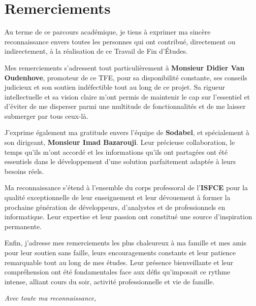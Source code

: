 \chapter*{Remerciements}

\noindent Au terme de ce parcours académique, je tiens à exprimer ma sincère reconnaissance envers toutes les personnes qui ont contribué, directement ou indirectement, à la réalisation de ce Travail de Fin d'Études.

\vspace{0.5cm}
\noindent Mes remerciements s'adressent tout particulièrement à \textbf{Monsieur Didier Van Oudenhove}, promoteur de ce TFE, pour sa disponibilité constante, ses conseils judicieux et son soutien indéfectible tout au long de ce projet. Sa rigueur intellectuelle et sa vision claire m'ont permis de maintenir le cap sur l'essentiel et d'éviter de me disperser parmi une multitude de fonctionnalités et de me laisser submerger par tous ceux-là.

\vspace{0.5cm}
\noindent J'exprime également ma gratitude envers l'équipe de \textbf{Sodabel}, et spécialement à son dirigeant, \textbf{Monsieur Imad Bazarouji}. Leur précieuse collaboration, le temps qu'ils m'ont accordé et les informations qu'ils ont partagées ont été essentiels dans le développement d'une solution parfaitement adaptée à leurs besoins réels.

\vspace{0.5cm}
\noindent Ma reconnaissance s'étend à l'ensemble du corps professoral de l'\textbf{ISFCE} pour la qualité exceptionnelle de leur enseignement et leur dévouement à former la prochaine génération de développeurs, d'analystes et de professionnels en informatique. Leur expertise et leur passion ont constitué une source d'inspiration permanente.

\vspace{0.5cm}
\noindent Enfin, j'adresse mes remerciements les plus chaleureux à ma famille et mes amis pour leur soutien sans faille, leurs encouragements constants et leur patience remarquable tout au long de mes études. Leur présence bienveillante et leur compréhension ont été fondamentales face aux défis qu'imposait ce rythme intense, alliant cours du soir, activité professionnelle et vie de famille.

\vspace{1cm}
\begin{flushright}
\textit{Avec toute ma reconnaissance,}\\
\vspace{0.3cm}
\end{flushright}

\newpage
